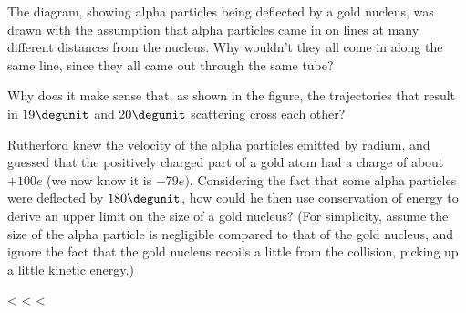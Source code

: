 \startdqs

\begin{dq}
        The diagram, showing alpha particles being deflected by a
        gold nucleus, was drawn with the assumption that alpha
        particles came in on lines at many different distances from
        the nucleus. Why wouldn't they all come in along the same
        line, since they all came out through the same tube?
\end{dq}

\begin{dq}        
        Why does it make sense that, as shown in the figure, the
        trajectories that result in $19\degunit$ and $20\degunit$
        scattering cross each other?
\end{dq}
\begin{dq}
        Rutherford knew the velocity of the alpha particles
        emitted by radium, and guessed that the positively charged
        part of a gold atom had a charge of about $+100e$ (we now
        know it is $+79e)$. Considering the fact that some alpha
        particles were deflected by $180\degunit$, how could he then
        use conservation of energy to derive an upper limit on the
        size of a gold nucleus? (For simplicity, assume the size of
        the alpha particle is negligible compared to that of the
        gold nucleus, and ignore the fact that the gold nucleus
        recoils a little from the collision, picking up a little kinetic energy.)
\end{dq}

  <%
  <%
    <%

